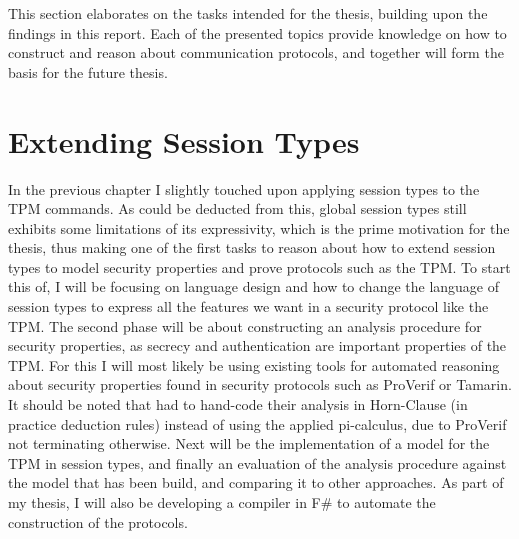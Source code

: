 \label{chap:Future Plan}
This section elaborates on the tasks intended for the thesis, building upon the findings in this report. Each of the presented topics provide knowledge on how to construct and reason about communication protocols, and together will form the basis for the future thesis. 

\section{Extending Session Types}
In the previous chapter I slightly touched upon applying session types to the TPM commands. As could be deducted from this, global session types still exhibits some limitations of its expressivity, which is the prime motivation for the thesis, thus making one of the first tasks to reason about how to extend session types to model security properties and prove protocols such as the TPM. 
To start this of, I will be focusing on language design and how to change the language of session types to express all the features we want in a security protocol like the TPM. 
The second phase will be about constructing an analysis procedure for security properties, as secrecy and authentication are important properties of the TPM. For this I will most likely be using existing tools for automated reasoning about security properties found in security protocols such as ProVerif or Tamarin. It should be noted that \citeauthor{DBLP:conf/ifip1-7/ChenR09} had to hand-code their analysis in Horn-Clause (in practice deduction rules) instead of using the applied pi-calculus, due to ProVerif not terminating otherwise.
Next will be the implementation of a model for the TPM in session types, and finally an evaluation of the analysis procedure against the model that has been build, and comparing it to other approaches. 
As part of my thesis, I will also be developing a compiler in F\# to automate the construction of the protocols.
\iffalse
For the future work section:
Since you?ve seen all these limitations, in the evaluation section, with session types to express security protocols, you would like to study a way to extend them to prove protocols like the TPM one correct.
The first phase should be language design: how to change the language of session types to express all the features we want of a security protocol like the TPM.
The second phase should be the construction of an analysis procedure for a security property (secrecy and authentication are important properties in the TPM), possibly using existing tools like ProVerif and Tamarin.
Next, the implementation of a model for the TPM in session types, possibly simplified if need be.
Finally, the evaluation of the analysis procedure against the model that we?ve built, and also in comparison to other approaches. 

Mention that the original paper on the TPM had to hand-code their analysis in Horn clauses (in practice deduction rules), instead of directly using the Applied Pi-calculus, because ProVerif would not terminate.
\fi